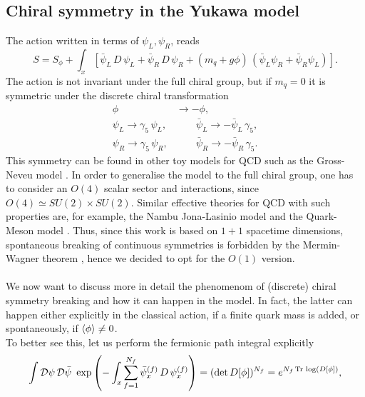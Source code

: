 \subsection{Chiral symmetry in the Yukawa model}
The action written in terms of $\psi_L, \psi_R$, reads
\begin{equation}
	S = S_\phi +  \int_x \left[\bar\psi_L \, D \, \psi_L + \bar\psi_R \, D \, \psi_R + (m_q + g\phi) \,  \left(\bar\psi_L\psi_R + \bar\psi_R\psi_L\right)\right].
	\label{eq:action_chirality_explicit}
\end{equation}
The action is not invariant under the full chiral group, but if $m_q = 0$ it is symmetric under the discrete chiral transformation
\begin{equation*}
    \begin{aligned}
        \phi &\to -\phi, \\
        \psi_L \to \gamma_5 \, \psi_L, &\qquad \bar\psi_L \to -\bar\psi_L \, \gamma_5, \\
        \psi_R \to \gamma_5 \, \psi_R, &\qquad \bar\psi_R \to -\bar\psi_R \, \gamma_5.
    \end{aligned}
\end{equation*}
This symmetry can be found in other toy models for QCD such as the Gross-Neveu model \cite{grossneveu}. In order to generalise the model to the full chiral group, one has to consider an $O(4)$ scalar sector and interactions, since $O(4) \simeq SU(2) \times SU(2)$. Similar effective theories for QCD with such properties are, for example, 
the Nambu \textendash{} Jona-Lasinio model \cite{Nambu1961DynamicalI,Nambu1961DynamicalII} and the Quark-Meson model \cite{quarkmeson1,quarkmeson2,quarkmeson3}. Thus, since this work is based on $1+1$ spacetime dimensions, spontaneous breaking of continuous symmetries is forbidden by the Mermin-Wagner theorem \cite{merminwagner}, hence we decided to opt for the $O(1)$ version. \\~\\
We now want to discuss more in detail the phenomenom of (discrete) chiral symmetry breaking and how it can happen in the model. In fact, the latter can happen either
explicitly in the classical action, if a finite quark mass is added, or spontaneously, if $\left\langle \phi \right\rangle \neq 0$. \\
To better see this, let us perform the fermionic path integral explicitly
\begin{equation*}
    \int \mathcal{D}\psi \, \mathcal{D} \bar\psi \ \exp\left( - \int_x \sum_{f=1}^{N_f} \bar\psi_x^{(f)} \,  D \, \psi_x^{(f)} \right) = (\text{det} \, D[\phi])^{N_f} = e^{N_f\operatorname{\text{Tr} \,} \log (D[\phi])},
\end{equation*}
